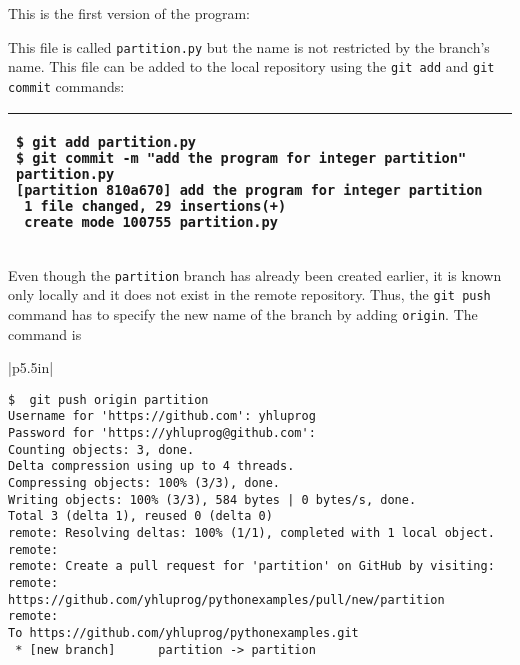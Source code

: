 
This is the first version of the program:

\resetlinenumber[1]
\linenumbers
\begin{tt}
  
\end{tt}
\nolinenumbers

This file is called {\tt partition.py} but the name is not restricted
by the branch's name.  This file can be added to the local repository
using the {\tt git add} and {\tt git commit} commands:

\vspace{0.2in}
\noindent
\begin{tabular}{|p{5in}|}\hline
\begin{verbatim}
$ git add partition.py 
$ git commit -m "add the program for integer partition" partition.py 
[partition 810a670] add the program for integer partition
 1 file changed, 29 insertions(+)
 create mode 100755 partition.py
\end{verbatim}
\\ \hline
\end{tabular}
\vspace{0.2in}

Even though the {\tt partition} branch has already been created earlier,
it is known only locally and it  does not exist in the remote repository.
Thus, the {\tt git push} command has to specify the new name of the branch
by adding {\tt origin}.
The command is


\vspace{0.2in}
\noindent
\begin{tabular}{|p{5.5in}|}\hline
\begin{verbatim}
$  git push origin partition
Username for 'https://github.com': yhluprog
Password for 'https://yhluprog@github.com': 
Counting objects: 3, done.
Delta compression using up to 4 threads.
Compressing objects: 100% (3/3), done.
Writing objects: 100% (3/3), 584 bytes | 0 bytes/s, done.
Total 3 (delta 1), reused 0 (delta 0)
remote: Resolving deltas: 100% (1/1), completed with 1 local object.
remote: 
remote: Create a pull request for 'partition' on GitHub by visiting:
remote:      https://github.com/yhluprog/pythonexamples/pull/new/partition
remote: 
To https://github.com/yhluprog/pythonexamples.git
 * [new branch]      partition -> partition
\end{verbatim}
\\ \hline
\end{tabular}
\vspace{0.2in}

